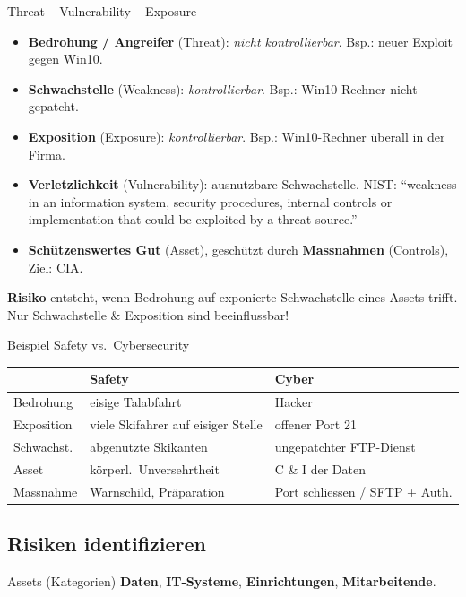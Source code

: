 \documentclass[a4paper, fontsize=7pt]{scrartcl}
\renewcommand*{\arraystretch}{1.5}  %
\begin{document}
\begin{mainbox}{Threat -- Vulnerability -- Exposure}
\begin{itemize}
    \item \textbf{Bedrohung / Angreifer} (Threat): \emph{nicht kontrollierbar}.
          Bsp.: neuer Exploit gegen Win10.
    \item \textbf{Schwachstelle} (Weakness): \emph{kontrollierbar}.
          Bsp.: Win10-Rechner nicht gepatcht.
    \item \textbf{Exposition} (Exposure): \emph{kontrollierbar}.
          Bsp.: Win10-Rechner überall in der Firma.
    \item \textbf{Verletzlichkeit} (Vulnerability): ausnutzbare Schwachstelle.
          NIST: ``weakness in an information system, security procedures,
          internal controls or implementation that could be exploited by a
          threat source.''
    \item \textbf{Schützenswertes Gut} (Asset), geschützt durch
          \textbf{Massnahmen} (Controls), Ziel: CIA.
\end{itemize}
\textbf{Risiko} entsteht, wenn Bedrohung auf exponierte Schwachstelle eines
Assets trifft. Nur Schwachstelle \& Exposition sind beeinflussbar!
\end{mainbox}

\begin{subbox}{Beispiel Safety vs.\ Cybersecurity}
\renewcommand*{\arraystretch}{1.15}
\begin{tabularx}{\linewidth}{@{}l|X|X@{}}
& \textbf{Safety} & \textbf{Cyber} \\
\hline
Bedrohung & eisige Talabfahrt & Hacker \\
Exposition & viele Skifahrer auf eisiger Stelle & offener Port 21 \\
Schwachst. & abgenutzte Skikanten & ungepatchter FTP-Dienst \\
Asset & körperl.\ Unversehrtheit & C \& I der Daten \\
Massnahme & Warnschild, Präparation & Port schliessen / SFTP + Auth. \\
\end{tabularx}
\end{subbox}

\subsection{Risiken identifizieren}

\begin{mainbox}{Assets (Kategorien)}
\textbf{Daten}, \textbf{IT-Systeme}, \textbf{Einrichtungen},
\textbf{Mitarbeitende}.
\end{mainbox}
\end{document}
